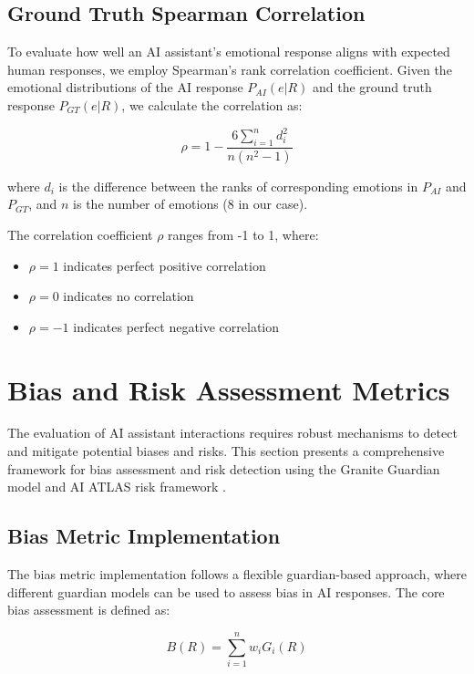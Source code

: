 \documentclass[12pt]{article}
\begin{document}
\subsection{Ground Truth Spearman Correlation}

To evaluate how well an AI assistant's emotional response aligns with expected human responses, we employ Spearman's rank correlation coefficient. Given the emotional distributions of the AI response $P_{AI}(e|R)$ and the ground truth response $P_{GT}(e|R)$, we calculate the correlation as:

\begin{equation}
    \rho = 1 - \frac{6\sum_{i=1}^{n} d_i^2}{n(n^2-1)}
\end{equation}

where $d_i$ is the difference between the ranks of corresponding emotions in $P_{AI}$ and $P_{GT}$, and $n$ is the number of emotions (8 in our case).

The correlation coefficient $\rho$ ranges from -1 to 1, where:
\begin{itemize}
    \item $\rho = 1$ indicates perfect positive correlation
    \item $\rho = 0$ indicates no correlation
    \item $\rho = -1$ indicates perfect negative correlation
\end{itemize}

\section{Bias and Risk Assessment Metrics}

The evaluation of AI assistant interactions requires robust mechanisms to detect and mitigate potential biases and risks. This section presents a comprehensive framework for bias assessment and risk detection using the Granite Guardian model \cite{ibm2024granite} and AI ATLAS risk framework \cite{ibm2024atlas}.

\subsection{Bias Metric Implementation}

The bias metric implementation follows a flexible guardian-based approach, where different guardian models can be used to assess bias in AI responses. The core bias assessment is defined as:

\begin{equation}
    B(R) = \sum_{i=1}^{n} w_i G_i(R)
\end{equation}
\end{document}
